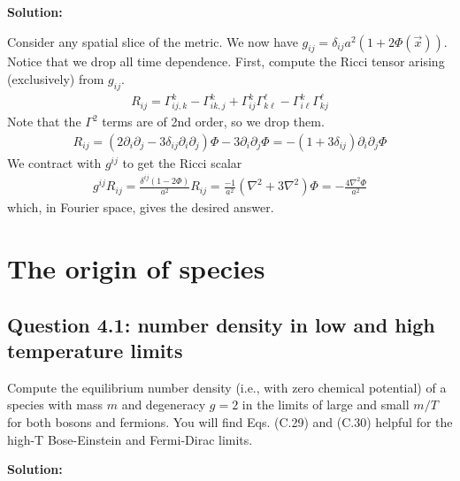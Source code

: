 \documentclass[11pt]{article}
\begin{document}
\textbf{Solution:}

Consider any spatial slice of the metric. We now have $g_{ij} = \delta_{ij} a^2 (1+2\Phi(\vec{x}))$. Notice that we drop all time dependence. First, compute the Ricci tensor arising (exclusively) from $g_{ij}$. 
\begin{align*}
    R_{ij} = \Gamma^k_{ij,k} - \Gamma^k_{ik,j} + \Gamma^k_{ij}\Gamma^\ell_{k\ell} - \Gamma^k_{i\ell}\Gamma^\ell_{kj}
\end{align*}
Note that the $\Gamma^2$ terms are of 2nd order, so we drop them. 
\begin{align*}
    R_{ij} = (2\partial_i\partial_j - 3\delta_{ij}\partial_i\partial_j) \Phi -3 \partial_i \partial_j\Phi = -(1 + 3\delta_{ij}) \partial_i\partial_j \Phi 
\end{align*}
We contract with $g^{ij}$ to get the Ricci scalar 
\begin{align*}
    g^{ij}R_{ij} = \frac{\delta^{ij}(1-2\Phi)}{a^2 } R_{ij} = \frac{-1}{a^2}(\nabla^2 + 3 \nabla^2)\Phi = -\frac{4\nabla^2 \Phi}{a^2}
\end{align*}
which, in Fourier space, gives the desired answer. 

\newpage 
\section{The origin of species}
\subsection{Question 4.1: number density in low and high temperature limits}
Compute the equilibrium number density (i.e., with zero chemical potential) of a species with mass $m$ and degeneracy $g= 2$ in the limits of large and small $m/T$ for both bosons and fermions. You will find Eqs. (C.29) and (C.30) helpful for the high-T Bose-Einstein and Fermi-Dirac limits. 

\textbf{Solution:}
\end{document}

